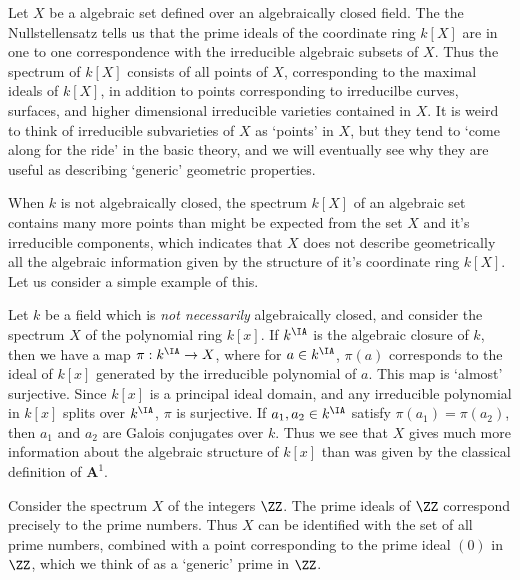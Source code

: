 \begin{example}
    Let $X$ be a algebraic set defined over an algebraically closed field. The the Nullstellensatz tells us that the prime ideals of the coordinate ring $k[X]$ are in one to one correspondence with the irreducible algebraic subsets of $X$. Thus the spectrum of $k[X]$ consists of all points of $X$, corresponding to the maximal ideals of $k[X]$, in addition to points corresponding to irreducilbe curves, surfaces, and higher dimensional irreducible varieties contained in $X$. It is weird to think of irreducible subvarieties of $X$ as `points' in $X$, but they tend to `come along for the ride' in the basic theory, and we will eventually see why they are useful as describing `generic' geometric properties.
\end{example}

When $k$ is not algebraically closed, the spectrum $k[X]$ of an algebraic set contains many more points than might be expected from the set $X$ and it's irreducible components, which indicates that $X$ does not describe geometrically all the algebraic information given by the structure of it's coordinate ring $k[X]$. Let us consider a simple example of this.

\begin{example}
    Let $k$ be a field which is \emph{not necessarily} algebraically closed, and consider the spectrum $X$ of the polynomial ring $k[x]$. If $k^{\IA}$ is the algebraic closure of $k$, then we have a map $\pi: k^{\IA} \to X$, where for $a \in k^{\IA}$, $\pi(a)$ corresponds to the ideal of $k[x]$ generated by the irreducible polynomial of $a$. This map is `almost' surjective. Since $k[x]$ is a principal ideal domain, and any irreducible polynomial in $k[x]$ splits over $k^{\IA}$, $\pi$ is surjective. If $a_1,a_2 \in k^{\IA}$ satisfy $\pi(a_1) = \pi(a_2)$, then $a_1$ and $a_2$ are Galois conjugates over $k$. Thus we see that $X$ gives much more information about the algebraic structure of $k[x]$ than was given by the classical definition of $\mathbf{A}^1$.
\end{example}

\begin{example}
    Consider the spectrum $X$ of the integers $\ZZ$. The prime ideals of $\ZZ$ correspond precisely to the prime numbers. Thus $X$ can be identified with the set of all prime numbers, combined with a point corresponding to the prime ideal $(0)$ in $\ZZ$, which we think of as a `generic' prime in $\ZZ$.
\end{example}

